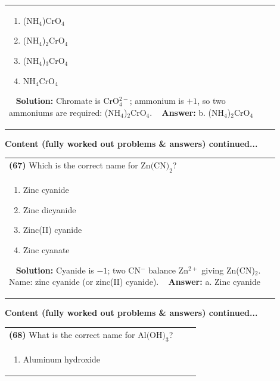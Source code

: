 \documentclass{article}
\begin{document}
{\begin{tabular}{|p{0.9\linewidth}|}
\begin{minipage}[t]{0.85\linewidth}
\begin{enumerate}[label=\alph*.]
\item (NH$_4$)CrO$_4$ \
\item (NH$_4$)$_2$CrO$_4$ \
\item (NH$_4$)$_3$CrO$_4$ \
\item NH$_4$CrO$_4$
\end{enumerate}
\end{minipage}\
\hline
\vspace{0.2cm}
\textbf{Solution:} Chromate is CrO$_4^{2-}$; ammonium is $+1$, so two ammoniums are required: (NH$_4$)$_2$CrO$_4$. \
\hline
\vspace{0.2cm}
\textbf{Answer:} b. (NH$_4$)$_2$CrO$_4$ \
\hline
\end{tabular}
\newpage
\noindent
{\large\textbf{Content (fully worked out problems & answers) continued...}}\\[0.2em]
\begin{tabular}{|p{0.9\linewidth}|}
\hline
\vspace{0.2cm}
\textbf{(67)} Which is the correct name for $\text{Zn(CN)}_2$? \\
\begin{minipage}[t]{0.85\linewidth}
\begin{enumerate}[label=\alph*.]
\item Zinc cyanide \
\item Zinc dicyanide \
\item Zinc(II) cyanide \
\item Zinc cyanate
\end{enumerate}
\end{minipage}\
\hline
\vspace{0.2cm}
\textbf{Solution:} Cyanide is $-1$; two CN$^-$ balance Zn$^{2+}$ giving Zn(CN)$_2$. Name: zinc cyanide (or zinc(II) cyanide). \
\hline
\vspace{0.2cm}
\textbf{Answer:} a. Zinc cyanide \
\hline
\end{tabular}
\newpage
\noindent
{\large\textbf{Content (fully worked out problems & answers) continued...}}\\[0.2em]
\begin{tabular}{|p{0.9\linewidth}|}
\hline
\vspace{0.2cm}
\textbf{(68)} What is the correct name for $\text{Al(OH)}_3$? \\
\begin{minipage}[t]{0.85\linewidth}
\begin{enumerate}[label=\alph*.]
\item Aluminum hydroxide \

\end{enumerate}
\end{minipage}
\end{tabular}}
\end{document}
